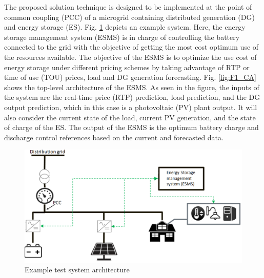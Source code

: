 The proposed solution technique is designed to be implemented at the point of common coupling (PCC) of a microgrid containing distributed generation (DG) and energy storage (ES). Fig. \ref{fig:system_arch} depicts an example system. Here, the energy storage management system (ESMS) is in charge of controlling the battery connected to the grid with the objective of getting the most cost optimum use of the resources available. The objective of the ESMS is to optimize the use cost of energy storage under different pricing schemes by taking advantage of RTP or time of use (TOU) prices, load and DG generation forecasting.  Fig. \ref{fig:F1_CA} shows the top-level architecture of the ESMS. As seen in the figure, the inputs of the system are the real-time price (RTP) prediction, load prediction, and the DG output prediction, which in this case is a photovoltaic (PV) plant output. It will also consider the current state of the load, current PV generation, and the state of charge of the ES. The output of the ESMS is the optimum battery charge and discharge control references based on the current and forecasted data.

\begin{figure}[!htbp]
\centering
\includegraphics[width=\linewidth]{figs/System_architecture.png}
\caption{Example test system architecture}
\label{fig:system_arch}
\vspace{-3mm}
\end{figure}


